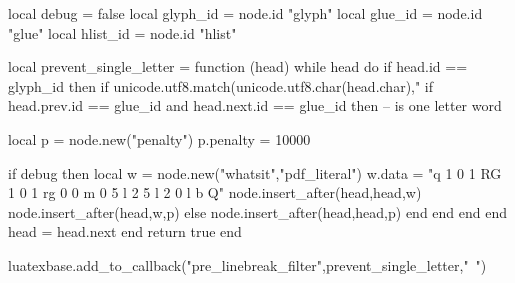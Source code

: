 \ifluatex
    \RequirePackage[T1]{fontenc}
    \RequirePackage[utf8]{luainputenc}
    \RequirePackage{luacode}
    \begin{luacode}
    local debug = false
    local glyph_id = node.id "glyph"
    local glue_id  = node.id "glue"
    local hlist_id = node.id "hlist"

    local prevent_single_letter = function (head)
        while head do
            if head.id == glyph_id then
                if unicode.utf8.match(unicode.utf8.char(head.char),"%
                    if head.prev.id == glue_id and head.next.id == glue_id then   -- is one letter word

                        local p = node.new("penalty")
                        p.penalty = 10000

                        if debug then
                            local w = node.new("whatsit","pdf_literal")
                            w.data = "q 1 0 1 RG 1 0 1 rg 0 0 m 0 5 l 2 5 l 2 0 l b Q"
                            node.insert_after(head,head,w)
                            node.insert_after(head,w,p)
                        else
                            node.insert_after(head,head,p)
                        end
                    end
                end
            end
            head = head.next
        end
        return true
    end

    luatexbase.add_to_callback("pre_linebreak_filter",prevent_single_letter,"~")
    \end{luacode}
\fi

\setlength{\parindent}{5mm}
\setcounter{tocdepth}{5}
\setcounter{secnumdepth}{5}
\let\oldsection\section
\renewcommand{\section}{
	\thispagestyle{plain}
	\oldsection
}

